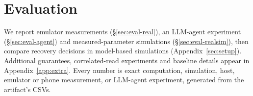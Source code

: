 \section{Evaluation}
\label{sec:eval}
We report emulator measurements (\S\ref{sec:eval-real}), an LLM-agent experiment (\S\ref{sec:eval-agent}) and measured-parameter simulations (\S\ref{sec:eval-realsim}), then compare recovery
decisions in model-based simulations (Appendix~\ref{sec:setup}). Additional guarantees, correlated-read experiments and baseline details appear in Appendix~\ref{app:extra}.
Every number is exact computation, simulation, host, emulator or phone measurement, or LLM-agent experiment, generated from the artifact's CSVs.




